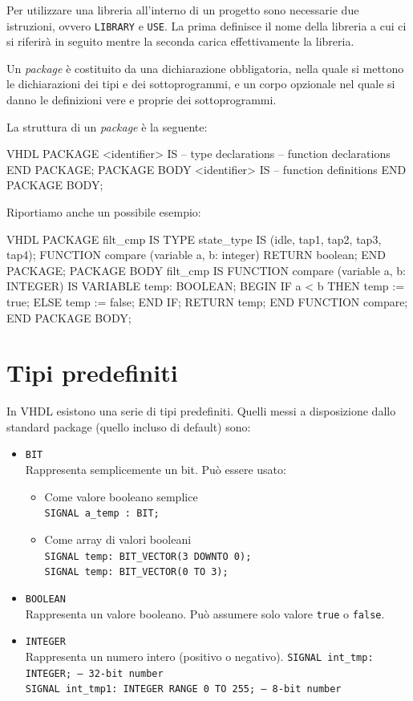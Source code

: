 \documentclass[10pt,a4paper,oneside]{scrbook}
\begin{document}
Per utilizzare una libreria all'interno di un progetto sono necessarie due 
istruzioni, ovvero \texttt{LIBRARY} e \texttt{USE}.
La prima definisce il nome della libreria a cui ci si riferirà in seguito 
mentre la seconda carica effettivamente la libreria.

Un \textit{package} è costituito da una dichiarazione obbligatoria, nella quale 
si mettono le dichiarazioni dei tipi e dei sottoprogrammi, e un corpo opzionale 
nel quale si danno le definizioni vere e proprie dei sottoprogrammi.

La struttura di un \textit{package} è la seguente:
\begin{sourcecode}{VHDL}
PACKAGE <identifier> IS
    -- type declarations
    -- function declarations
END PACKAGE;
PACKAGE BODY <identifier> IS
    -- function definitions
END PACKAGE BODY;
\end{sourcecode}
Riportiamo anche un possibile esempio:
\begin{sourcecode}{VHDL}
PACKAGE filt_cmp IS
    TYPE state_type IS (idle, tap1, tap2, tap3, tap4);
    FUNCTION compare (variable a, b: integer) RETURN boolean;
END PACKAGE;
PACKAGE BODY filt_cmp IS
    FUNCTION compare (variable a, b: INTEGER) IS
        VARIABLE temp: BOOLEAN;
    BEGIN
        IF a < b THEN
            temp := true;
        ELSE
            temp := false;
        END IF;
        RETURN temp;
    END FUNCTION compare;
END PACKAGE BODY;
\end{sourcecode}



\section{Tipi predefiniti}
In VHDL esistono una serie di tipi predefiniti. Quelli messi a disposizione 
dallo standard package (quello incluso di default) sono:
\begin{itemize}
    \item \texttt{BIT}\\
    Rappresenta semplicemente un bit. Può essere usato:
    \begin{itemize}
        \item Come valore booleano semplice\\
        {\texttt{SIGNAL a_temp : BIT;}}
        \item Come array di valori booleani\\
        {\texttt{SIGNAL temp: BIT_VECTOR(3 DOWNTO 0);}}\\
        {\texttt{SIGNAL temp: BIT_VECTOR(0 TO 3);}}
    \end{itemize}
    \item \texttt{BOOLEAN}\\
    Rappresenta un valore booleano. Può assumere solo valore \texttt{true} o 
    \texttt{false}.
    \item \texttt{INTEGER}\\
    Rappresenta un numero intero (positivo o negativo).
    {\texttt{SIGNAL int_tmp: INTEGER; -- 32-bit number}}\\
    {\texttt{SIGNAL int_tmp1: INTEGER RANGE 0 TO 255; -- 8-bit 
    number}}
\end{itemize}
\end{document}
